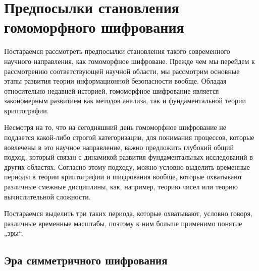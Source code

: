   \section{Предпосылки становления гомоморфного шифрования} \label{sec:ch1/sec1}

   Постараемся рассмотреть предпосылки становления такого современного научного направления, как гомоморфное шифроване. Прежде чем мы перейдем к рассмотрению соответствующей научной области, мы рассмотрим основные этапы развития теории информационной безопасности вообще. Обладая относительно недавней историей, гомоморфное шифрование является закономерным развитием как методов анализа, так и фундаментальной теории криптографии.\par
   Несмотря на то, что на сегодняшний день гомоморфное шифрование не поддается какой-либо строгой категоризации, для понимания процессов, которые вовлечены в это научное направление, важно предложить глубокий общий подход, который связан с динамикой развития фундаментальных исследований в других областях. Согласно этому подходу, можно условно выделить временные периоды  в теории криптографии и шифрования вообще, которые охватывают различные смежные дисциплины, как, например, теорию чисел или теорию вычислительной сложности.\par
   Постараемся выделить три таких периода, которые охватывают, условно говоря, различные временные масштабы, поэтому к ним больше применимо понятие „эры“.\par

   \subsection{Эра симметричного шифрования} \label{subsec:ch1/sec1/sub1}

